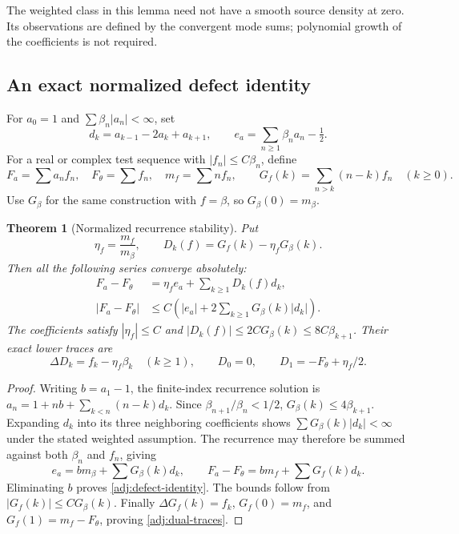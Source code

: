 \documentclass[11pt]{article}
\numberwithin{equation}{section}
\newtheorem{theorem}{Theorem}[section]
\theoremstyle{definition}
\theoremstyle{remark}
\begin{document}
The weighted class in this lemma need not have a smooth source density
at zero.  Its observations are defined by the convergent mode sums;
polynomial growth of the coefficients is not required.

\subsection{An exact normalized defect identity}

For $a_0=1$ and $\sum\beta_n|a_n|<\infty$, set
\[
 d_k=a_{k-1}-2a_k+a_{k+1},\qquad
 e_a=\sum_{n\ge1}\beta_na_n-\tfrac12.
\]
For a real or complex test sequence with $|f_n|\le C\beta_n$, define
\[
 F_a=\sum a_nf_n,\quad F_\theta=\sum f_n,\quad m_f=\sum nf_n,
 \qquad G_f(k)=\sum_{n>k}(n-k)f_n\quad(k\ge0).
\]
Use $G_\beta$ for the same construction with $f=\beta$, so
$G_\beta(0)=m_\beta$.

\begin{theorem}[Normalized recurrence stability]
\label{adj:defect-stability}
Put
\[
 \eta_f=\frac{m_f}{m_\beta},\qquad
 D_k(f)=G_f(k)-\eta_fG_\beta(k).
\]
Then all the following series converge absolutely:
\begin{align}
 F_a-F_\theta&=\eta_fe_a+\sum_{k\ge1}D_k(f)d_k,
 \label{adj:defect-identity}\\
 |F_a-F_\theta|&\le
 C\left(|e_a|+2\sum_{k\ge1}G_\beta(k)|d_k|\right).
 \label{adj:defect-estimate}
\end{align}
The coefficients satisfy
$|\eta_f|\le C$ and
$|D_k(f)|\le2CG_\beta(k)\le8C\beta_{k+1}$.
Their exact lower traces are
\begin{equation}
 \Delta D_k=f_k-\eta_f\beta_k\quad(k\ge1),\qquad
 D_0=0,\qquad D_1=-F_\theta+\eta_f/2.
 \label{adj:dual-traces}
\end{equation}
\end{theorem}
\begin{proof}
Writing $b=a_1-1$, the finite-index recurrence solution is
$a_n=1+nb+\sum_{k<n}(n-k)d_k$.
Since $\beta_{n+1}/\beta_n<1/2$,
$G_\beta(k)\le4\beta_{k+1}$.
Expanding $d_k$ into its three neighboring coefficients shows
$\sum G_\beta(k)|d_k|<\infty$ under the stated weighted assumption.
The recurrence may therefore be summed against both $\beta_n$ and
$f_n$, giving
\[
 e_a=bm_\beta+\sum G_\beta(k)d_k,\qquad
 F_a-F_\theta=bm_f+\sum G_f(k)d_k.
\]
Eliminating $b$ proves \eqref{adj:defect-identity}.
The bounds follow from $|G_f(k)|\le CG_\beta(k)$.
Finally $\Delta G_f(k)=f_k$,
$G_f(0)=m_f$, and $G_f(1)=m_f-F_\theta$, proving
\eqref{adj:dual-traces}.
\end{proof}
\end{document}
